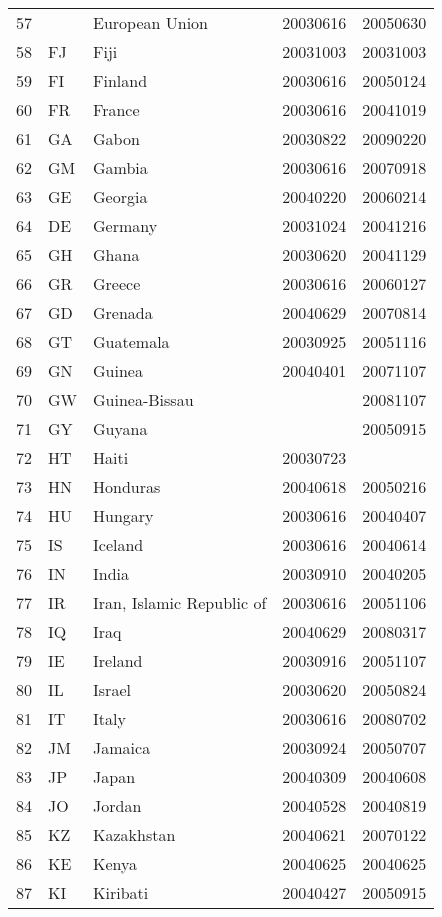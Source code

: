\begin{longtable}{rllrr}
  57 &  & European Union & 20030616 & 20050630 \\ 
  58 & FJ & Fiji & 20031003 & 20031003 \\ 
  59 & FI & Finland & 20030616 & 20050124 \\ 
  60 & FR & France & 20030616 & 20041019 \\ 
  61 & GA & Gabon & 20030822 & 20090220 \\ 
  62 & GM & Gambia & 20030616 & 20070918 \\ 
  63 & GE & Georgia & 20040220 & 20060214 \\ 
  64 & DE & Germany & 20031024 & 20041216 \\ 
  65 & GH & Ghana & 20030620 & 20041129 \\ 
  66 & GR & Greece & 20030616 & 20060127 \\ 
  67 & GD & Grenada & 20040629 & 20070814 \\ 
  68 & GT & Guatemala & 20030925 & 20051116 \\ 
  69 & GN & Guinea & 20040401 & 20071107 \\ 
  70 & GW & Guinea-Bissau &  & 20081107 \\ 
  71 & GY & Guyana &  & 20050915 \\ 
  72 & HT & Haiti & 20030723 &  \\ 
  73 & HN & Honduras & 20040618 & 20050216 \\ 
  74 & HU & Hungary & 20030616 & 20040407 \\ 
  75 & IS & Iceland & 20030616 & 20040614 \\ 
  76 & IN & India & 20030910 & 20040205 \\ 
  77 & IR & Iran, Islamic Republic of & 20030616 & 20051106 \\ 
  78 & IQ & Iraq & 20040629 & 20080317 \\ 
  79 & IE & Ireland & 20030916 & 20051107 \\ 
  80 & IL & Israel & 20030620 & 20050824 \\ 
  81 & IT & Italy & 20030616 & 20080702 \\ 
  82 & JM & Jamaica & 20030924 & 20050707 \\ 
  83 & JP & Japan & 20040309 & 20040608 \\ 
  84 & JO & Jordan & 20040528 & 20040819 \\ 
  85 & KZ & Kazakhstan & 20040621 & 20070122 \\ 
  86 & KE & Kenya & 20040625 & 20040625 \\ 
  87 & KI & Kiribati & 20040427 & 20050915 \\ 

\end{longtable}
